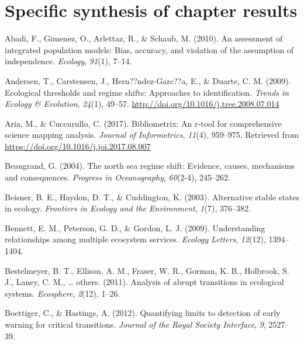 \documentclass[12pt,twoside,openany]{reedthesis}
\begin{document}
\hypertarget{specific-synthesis-of-chapter-results}{%
\section{Specific synthesis of chapter results}\label{specific-synthesis-of-chapter-results}}

\hypertarget{refs}{}
\leavevmode\hypertarget{ref-abadi2010assessment}{}%
Abadi, F., Gimenez, O., Arlettaz, R., \& Schaub, M. (2010). An assessment of integrated population models: Bias, accuracy, and violation of the assumption of independence. \emph{Ecology}, \emph{91}(1), 7--14.

\leavevmode\hypertarget{ref-andersen_ecological_2009}{}%
Andersen, T., Carstensen, J., Hern??ndez-Garc??a, E., \& Duarte, C. M. (2009). Ecological thresholds and regime shifts: Approaches to identification. \emph{Trends in Ecology \& Evolution}, \emph{24}(1), 49--57. \url{http://doi.org/10.1016/j.tree.2008.07.014}

\leavevmode\hypertarget{ref-bibliometrix}{}%
Aria, M., \& Cuccurullo, C. (2017). Bibliometrix: An r-tool for comprehensive science mapping analysis. \emph{Journal of Informetrics}, \emph{11}(4), 959--975. Retrieved from \url{https://doi.org/10.1016/j.joi.2017.08.007}

\leavevmode\hypertarget{ref-beaugrand2004north}{}%
Beaugrand, G. (2004). The north sea regime shift: Evidence, causes, mechanisms and consequences. \emph{Progress in Oceanography}, \emph{60}(2-4), 245--262.

\leavevmode\hypertarget{ref-beisner2003alternative}{}%
Beisner, B. E., Haydon, D. T., \& Cuddington, K. (2003). Alternative stable states in ecology. \emph{Frontiers in Ecology and the Environment}, \emph{1}(7), 376--382.

\leavevmode\hypertarget{ref-bennett2009understanding}{}%
Bennett, E. M., Peterson, G. D., \& Gordon, L. J. (2009). Understanding relationships among multiple ecosystem services. \emph{Ecology Letters}, \emph{12}(12), 1394--1404.

\leavevmode\hypertarget{ref-bestelmeyer_analysis_2011}{}%
Bestelmeyer, B. T., Ellison, A. M., Fraser, W. R., Gorman, K. B., Holbrook, S. J., Laney, C. M., \ldots{} others. (2011). Analysis of abrupt transitions in ecological systems. \emph{Ecosphere}, \emph{2}(12), 1--26.

\leavevmode\hypertarget{ref-boettiger_quantifying_2012}{}%
Boettiger, C., \& Hastings, A. (2012). Quantifying limits to detection of early warning for critical transitions. \emph{Journal of the Royal Society Interface}, \emph{9}, 2527--39.
\end{document}
